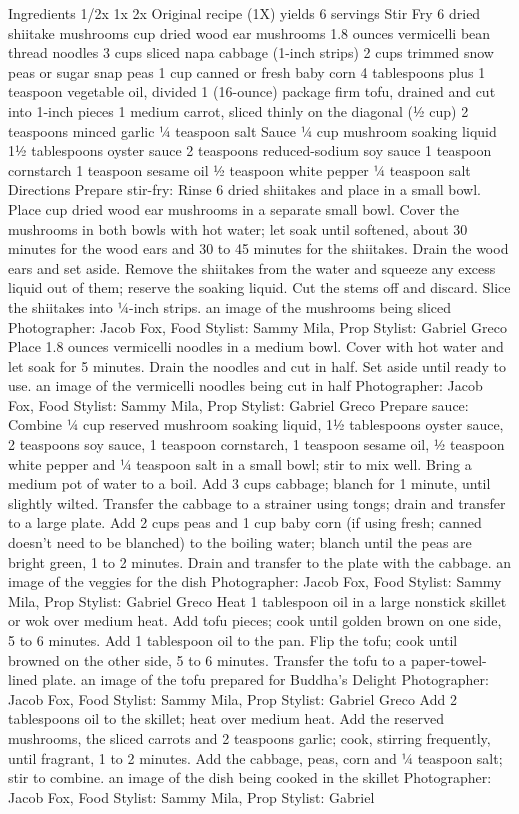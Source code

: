 Ingredients 1/2x 1x 2x Original recipe (1X) yields 6 servings Stir Fry 6 dried shiitake mushrooms  cup dried wood ear mushrooms 1.8 ounces vermicelli bean thread noodles 3 cups sliced napa cabbage (1-inch strips) 2 cups trimmed snow peas or sugar snap peas 1 cup canned or fresh baby corn 4 tablespoons plus 1 teaspoon vegetable oil, divided 1 (16-ounce) package firm tofu, drained and cut into 1-inch pieces 1 medium carrot, sliced thinly on the diagonal (½ cup) 2 teaspoons minced garlic ¼ teaspoon salt Sauce ¼ cup mushroom soaking liquid 1½ tablespoons oyster sauce 2 teaspoons reduced-sodium soy sauce 1 teaspoon cornstarch 1 teaspoon sesame oil ½ teaspoon white pepper ¼ teaspoon salt Directions Prepare stir-fry: Rinse 6 dried shiitakes and place in a small bowl. Place  cup dried wood ear mushrooms in a separate small bowl. Cover the mushrooms in both bowls with hot water; let soak until softened, about 30 minutes for the wood ears and 30 to 45 minutes for the shiitakes. Drain the wood ears and set aside. Remove the shiitakes from the water and squeeze any excess liquid out of them; reserve the soaking liquid. Cut the stems off and discard. Slice the shiitakes into ¼-inch strips. an image of the mushrooms being sliced Photographer: Jacob Fox, Food Stylist: Sammy Mila, Prop Stylist: Gabriel Greco Place 1.8 ounces vermicelli noodles in a medium bowl. Cover with hot water and let soak for 5 minutes. Drain the noodles and cut in half. Set aside until ready to use. an image of the vermicelli noodles being cut in half Photographer: Jacob Fox, Food Stylist: Sammy Mila, Prop Stylist: Gabriel Greco Prepare sauce: Combine ¼ cup reserved mushroom soaking liquid, 1½ tablespoons oyster sauce, 2 teaspoons soy sauce, 1 teaspoon cornstarch, 1 teaspoon sesame oil, ½ teaspoon white pepper and ¼ teaspoon salt in a small bowl; stir to mix well. Bring a medium pot of water to a boil. Add 3 cups cabbage; blanch for 1 minute, until slightly wilted. Transfer the cabbage to a strainer using tongs; drain and transfer to a large plate. Add 2 cups peas and 1 cup baby corn (if using fresh; canned doesn’t need to be blanched) to the boiling water; blanch until the peas are bright green, 1 to 2 minutes. Drain and transfer to the plate with the cabbage. an image of the veggies for the dish Photographer: Jacob Fox, Food Stylist: Sammy Mila, Prop Stylist: Gabriel Greco Heat 1 tablespoon oil in a large nonstick skillet or wok over medium heat. Add tofu pieces; cook until golden brown on one side, 5 to 6 minutes. Add 1 tablespoon oil to the pan. Flip the tofu; cook until browned on the other side, 5 to 6 minutes. Transfer the tofu to a paper-towel-lined plate. an image of the tofu prepared for Buddha's Delight Photographer: Jacob Fox, Food Stylist: Sammy Mila, Prop Stylist: Gabriel Greco Add 2 tablespoons oil to the skillet; heat over medium heat. Add the reserved mushrooms, the sliced carrots and 2 teaspoons garlic; cook, stirring frequently, until fragrant, 1 to 2 minutes. Add the cabbage, peas, corn and ¼ teaspoon salt; stir to combine. an image of the dish being cooked in the skillet Photographer: Jacob Fox, Food Stylist: Sammy Mila, Prop Stylist: Gabriel 